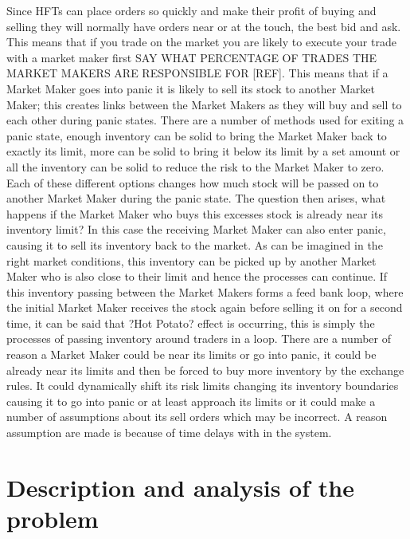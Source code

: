 \documentclass{article}
\begin{document}
Since HFTs can place orders so quickly and make their profit of buying and selling they will normally have orders near or at the touch, the best bid and ask. This means that if you trade on the market you are likely to execute your trade with a market maker first SAY WHAT PERCENTAGE OF TRADES THE MARKET MAKERS ARE RESPONSIBLE FOR [REF]. This means that if a Market Maker goes into panic it is likely to sell its stock to another Market Maker; this creates links between the Market Makers as they will buy and sell to each other during panic states.  
There are a number of methods used for exiting a panic state, enough inventory can be solid to bring the Market Maker back to exactly its limit, more can be solid to bring it below its limit by a set amount or all the inventory can be solid to reduce the risk to the Market Maker to zero. Each of these different options changes how much stock will be passed on to another Market Maker during the panic state.
The question then arises, what happens if the Market Maker who buys this excesses stock is already near its inventory limit? In this case the receiving Market Maker can also enter panic, causing it to sell its inventory back to the market. As can be imagined in the right market conditions, this inventory can be picked up by another Market Maker who is also close to their limit and hence the processes can continue. If this inventory passing between the Market Makers forms a feed bank loop, where the initial Market Maker receives the stock again before selling it on for a second time, it can be said that ?Hot Potato? effect is occurring, this is simply the processes of passing inventory around traders in a loop.    
There are a number of reason a Market Maker could be near its limits or go into panic, it could be already near its limits and then be forced to buy more inventory by the exchange rules. It could dynamically shift its risk limits changing its inventory boundaries causing it to go into panic or at least approach its limits or it could make a number of assumptions about its sell orders which may be incorrect. 
A reason assumption are made is because of time delays with in the system. 






\section {Description and analysis of the problem} 
\end{document}

